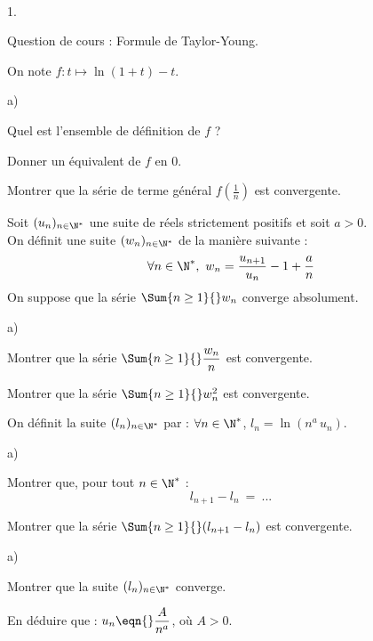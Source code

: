\documentclass[11pt]{article}%
\begin{document}
\begin{exerciceAP}~
  \begin{noliste}{1.}
    \item Question de cours : Formule de Taylor-Young.
    
    \item On note $f: t \mapsto \ln(1+t) -t$.
    \begin{noliste}{a)}
      \item Quel est l'ensemble de définition de $f$ ?
      
      \item Donner un équivalent de $f$ en $0$.
      
      \item Montrer que la série de terme général $f\left( \frac{1}{n}
        \right)$ est convergente.
    \end{noliste}
    
  \item Soit $(u_n)_{n \in \N^*}$ une suite de réels strictement
    positifs et soit $a>0$. \\
    On définit une suite $(w_n)_{n \in \N^*}$ de la manière suivante :
    \[
      \forall n \in \N^*, \ w_n = \dfrac{u_{n+1}}{u_n} -1 + 
      \dfrac{a}{n}
    \]
    On suppose que la série $\Sum{n \geq 1}{} w_n$ converge 
    absolument.
    \begin{noliste}{a)}
      \item Montrer que la série $\Sum{n \geq 1}{} \dfrac{w_n}{n}$
      est convergente.
      
      \item Montrer que la série $\Sum{n \geq 1}{} w_n^2$ est 
      convergente.
    \end{noliste}
    
  \item On définit la suite $(l_n)_{n \in \N^*}$ par : $\forall n \in
    \N^*$, $l_n = \ln (n^a \, u_n)$.
    \begin{noliste}{a)}
      \item Montrer que, pour tout $n \in \N^*$ :
      \[
        l_{n+1} - l_n \ = \ ...
      \]
      
      \item Montrer que la série $\Sum{n \geq 1}{} (l_{n+1} - l_n)$
      est convergente.
    \end{noliste}
    
    \item 
    \begin{noliste}{a)}
      \item Montrer que la suite $(l_n)_{n \in \N^*}$ converge.
      
      \item En déduire que : $u_n \eqn{} \dfrac{A}{n^a}$, où $A>0$.
    \end{noliste}
  \end{noliste}
\end{exerciceAP}
\end{document}
